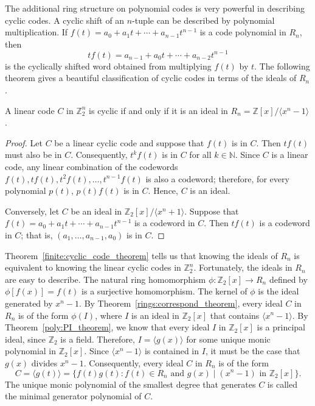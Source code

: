 The additional ring structure on polynomial codes is very powerful in describing cyclic codes. A cyclic shift of an $n$-tuple can be described by polynomial multiplication.  If $f(t) = a_0 + a_1 t + \cdots + a_{n-1} t^{n-1}$ is a code polynomial in $R_n$, then
\[
tf(t) = a_{n-1} + a_0 t + \cdots + a_{n-2} t^{n-1}
\]
is the cyclically shifted word obtained from multiplying $f(t)$ by $t$.  The following theorem gives a beautiful classification of cyclic codes in terms of the ideals of $R_n$.

\begin{theorem} \label{finite:cyclic_code_theorem}
A linear code $C$ in ${\mathbb Z}_2^n$ is cyclic if and only if it is an ideal in $R_n = {\mathbb Z}[x] / \langle x^n - 1 \rangle$. 
\end{theorem}
 
\begin{proof}
Let $C$ be a linear cyclic code and suppose that $f(t)$ is in $C$.  Then $t f(t)$ must also be in $C$. Consequently, $t^k f(t)$ is in $C$ for all $k \in {\mathbb N}$.  Since $C$ is a linear code, any linear combination of the codewords $f(t), tf(t), t^2f(t), \ldots, t^{n-1}f(t)$ is also a codeword; therefore, for every polynomial $p(t)$, $p(t)f(t)$ is in $C$.  Hence, $C$ is an ideal. 

Conversely, let $C$ be an ideal in ${\mathbb Z}_2[x]/\langle x^n + 1\rangle$. Suppose that $f(t) = a_0 + a_1 t + \cdots + a_{n - 1} t^{n - 1}$ is a codeword in $C$.  Then $t f(t)$ is a codeword in $C$; that is, $(a_1, \ldots, a_{n-1}, a_0)$ is in $C$.
\end{proof} 

\medskip

Theorem~\ref{finite:cyclic_code_theorem} tells us that knowing the ideals of $R_n$ is equivalent to knowing the linear cyclic codes in ${\mathbb Z}_2^n$.  Fortunately, the ideals in $R_n$ are easy to describe.  The  natural ring homomorphism $\phi : {\mathbb Z}_2[x] \rightarrow R_n$ defined by $\phi[f(x)] = f(t)$ is a surjective homomorphism.  The kernel of $\phi$ is the ideal generated by $x^n - 1$.  By Theorem~\ref{rings:correspond_theorem}, every ideal $C$ in $R_n$ is of the form $\phi(I)$, where $I$ is an ideal in ${\mathbb Z}_2[x]$ that contains $\langle x^n - 1 \rangle$.  By Theorem~\ref{poly:PI_theorem}, we know that every ideal $I$ in ${\mathbb Z}_2[x]$ is a principal ideal, since ${\mathbb Z}_2$ is a field. Therefore, $I = \langle g(x) \rangle$ for some unique monic polynomial in ${\mathbb Z}_2[x]$. Since $\langle x^n - 1 \rangle$ is contained in $I$, it must be the case that $g(x)$ divides $x^n - 1$. Consequently, every ideal $C$ in $R_n$ is of the form 
\[
C= \langle g(t) \rangle = \{ f(t)g(t) : f(t) \in R_n \mbox{ and $g(x)
\mid (x^n - 1)$ in } {\mathbb Z}_2[x] \}.
\] 
The unique monic polynomial of the smallest degree that generates $C$ is called the {\bfi minimal generator polynomial\/} of $C$. 


